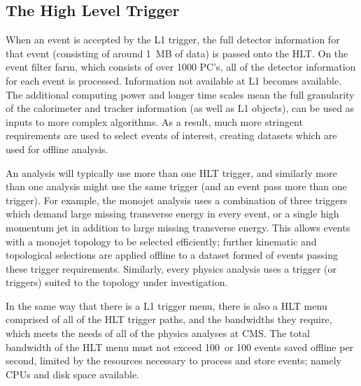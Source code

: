 \subsection{The High Level Trigger}

When an event is accepted by the L1 trigger, the full detector information for that event (consisting of around 1~MB of data) is passed onto the \ac{HLT}.
On the event filter farm, which consists of over 1000 PC's, all of the detector information for each event is processed.
Information not available at \ac{L1} becomes available. 
The additional computing power and longer time scales mean the full granularity of the calorimeter and tracker information 
(as well as \ac{L1} objects), can be used as inputs to more complex algorithms.
As a result, much more stringent requirements are used to select events of interest, creating datasets which are used for offline analysis.


An analysis will typically use more than one \ac{HLT} trigger, and similarly more than one analysis might use the same trigger (and an event pass more than one trigger).
For example, the monojet analysis %
uses a combination of three triggers which demand large missing transverse energy in every event, or a single high momentum jet in addition to large missing transverse energy.
This allows events with a monojet topology to be selected efficiently; further kinematic and topological selections are applied offline to a dataset formed of events passing these trigger requirements.
Similarly, every physics analysis uses a trigger (or triggers) suited to the topology under investigation.


In the same way that there is a L1 trigger menu, there is also a \ac{HLT} menu 
comprised of all of the \ac{HLT} trigger paths, and the bandwidths they require, which meets the needs of all of the physics analyses at \ac{CMS}.
The total bandwidth of the \ac{HLT} menu must not exceed 100~\Hz or 100 events saved offline per second, limited by the resources necessary to process and store events; namely \ac{CPU}s and disk space available.

